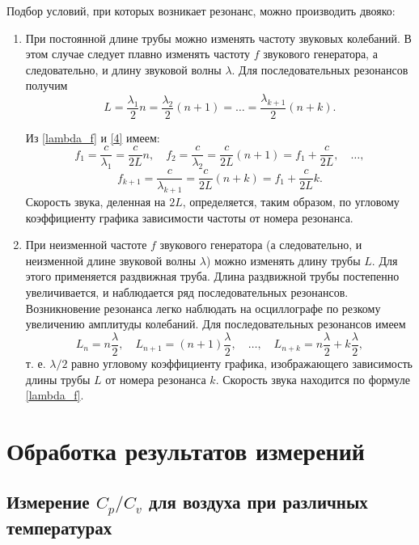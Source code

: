 \documentclass[12pt,a4paper]{article}
\begin{document}
Подбор условий, при которых возникает резонанс, можно производить двояко:
\begin{enumerate}
	\item При постоянной длине трубы можно изменять частоту звуковых колебаний. В этом случае следует плавно изменять частоту $ f $ звукового генератора, а следовательно, и длину звуковой волны $ \lambda $. Для последовательных резонансов получим 
	\begin{equation}\label{4}
	L=\frac{\lambda_1}{2}n=\frac{\lambda_2}{2}(n+1)=\dots=\frac{\lambda_{k+1}}{2}(n+k).
	\end{equation}
	
	Из \eqref{lambda_f} и \eqref{4} имеем:
	\[ f_1=\frac{c}{\lambda_1}=\frac{c}{2L}n, \quad f_2=\frac{c}{\lambda_2}=\frac{c}{2L}(n+1)=f_1+\frac{c}{2L},\quad \dots, \]
	\begin{equation}\label{5}
	f_{k+1}=\frac{c}{\lambda_{k+1}}=\frac{c}{2L}(n+k)=f_1+\frac{c}{2L}k.
	\end{equation}
	Скорость звука, деленная на $ 2L $, определяется, таким образом, по угловому коэффициенту графика зависимости частоты от номера резонанса.
	\item При неизменной частоте $ f $ звукового генератора (а следовательно, и неизменной длине звуковой волны $ \lambda $) можно изменять длину трубы $ L $. Для этого применяется раздвижная труба. Длина раздвижной трубы постепенно увеличивается, и наблюдается ряд последовательных резонансов. Возникновение резонанса легко наблюдать на осциллографе по резкому увеличению амплитуды колебаний. Для последовательных резонансов имеем \begin{equation}\label{first}
	L_n=n\frac{\lambda}{2}, \quad L_{n+1}=(n+1)\frac{\lambda}{2}, \quad \dots, \quad L_{n+k} = n\frac{\lambda}{2}+k\frac{\lambda}{2},
	\end{equation} т. е. $ \lambda/2 $ равно угловому коэффициенту графика, изображающего зависимость длины трубы $ L $ от номера резонанса $ k $. Скорость звука находится по формуле \eqref{lambda_f}.
\end{enumerate}

 
\section{Обработка результатов измерений}
\subsection{Измерение $ C_p/C_v $ для воздуха при различных температурах}
\end{document}
